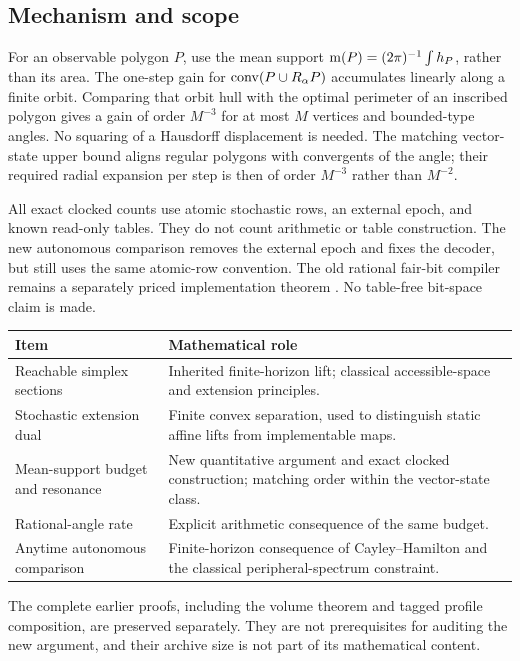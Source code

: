 \subsection{Mechanism and scope}
For an observable polygon $P$, use the mean support
$\operatorname{m}(P)=(2\pi)^{-1}\int h_P$, rather than its area.
The one-step gain for $\operatorname{conv}(P\cup R_\alpha P)$ accumulates linearly
along a finite orbit. Comparing that orbit hull with the optimal perimeter
of an inscribed polygon gives a gain of order $M^{-3}$ for at most $M$
vertices and bounded-type angles. No squaring of a Hausdorff displacement
is needed. The matching vector-state upper bound aligns regular polygons
with convergents of the angle; their required radial expansion per step
is then of order $M^{-3}$ rather than $M^{-2}$.

All exact clocked counts use atomic stochastic rows, an external epoch,
and known read-only tables. They do not count arithmetic or table
construction. The new autonomous comparison removes the external epoch
and fixes the decoder, but still uses the same atomic-row convention.
The old rational fair-bit compiler remains a separately priced
implementation theorem \cite{GTF31}. No table-free bit-space claim is made.

\begin{center}\small
\begin{tabular}{p{}p{}}
\toprule
Item & Mathematical role\\\midrule
Reachable simplex sections & Inherited finite-horizon lift; classical
accessible-space and extension principles.\\
Stochastic extension dual & Finite convex separation, used to distinguish
static affine lifts from implementable maps.\\
Mean-support budget and resonance & New quantitative argument and exact
clocked construction; matching order within the vector-state class.\\
Rational-angle rate & Explicit arithmetic consequence of the same budget.\\
Anytime autonomous comparison & Finite-horizon consequence of
Cayley--Hamilton and the classical peripheral-spectrum constraint.\\
\bottomrule
\end{tabular}
\end{center}
The complete earlier proofs, including the volume theorem and tagged
profile composition, are preserved separately. They are not prerequisites
for auditing the new argument, and their archive size is not part of its
mathematical content.
